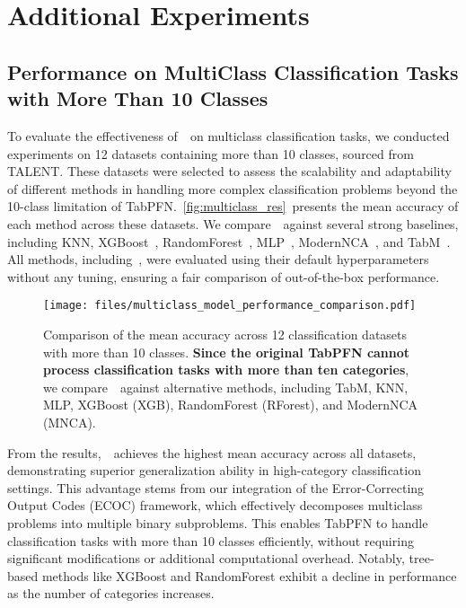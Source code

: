 \section{Additional Experiments}
\label{appendix:results}


\subsection{Performance on MultiClass Classification Tasks with
More Than 10 Classes}
To evaluate the effectiveness of~\name~on multiclass classification tasks, we conducted experiments on 12 datasets containing more than 10 classes, sourced from TALENT\cite{YeACloser}. These datasets were selected to assess the scalability and adaptability of different methods in handling more complex classification problems beyond the 10-class limitation of TabPFN.~\autoref{fig:multiclass_res}~presents the mean accuracy of each method across these datasets. We compare~\name~against several strong baselines, including KNN, XGBoost~\cite{chen2016xgboost}, RandomForest~\cite{Breiman01RandomForest}, MLP~\cite{GorishniyRKB21Revisiting}, ModernNCA~\cite{Ye2024ModernNCA}, and TabM~\cite{Yury2024TabM}.
 All methods, including~\name, were evaluated using their default hyperparameters without any tuning, ensuring a fair comparison of out-of-the-box performance.
\begin{figure}
    \centering
    \texttt{[image: files/multiclass\_model\_performance\_comparison.pdf]}
    \caption{Comparison of the mean accuracy across 12 classification datasets with more than 10 classes. \textbf{Since the original TabPFN cannot process classification tasks with more than ten categories}, we compare~\name~against alternative methods, including TabM, KNN, MLP, XGBoost (XGB), RandomForest (RForest), and ModernNCA (MNCA). }
    \label{fig:multiclass_res}
\end{figure}
From the results,~\name~achieves the highest mean accuracy across all datasets, demonstrating superior generalization ability in high-category classification settings. This advantage stems from our integration of the Error-Correcting Output Codes (ECOC) framework, which effectively decomposes multiclass problems into multiple binary subproblems. This enables TabPFN to handle classification tasks with more than 10 classes efficiently, without requiring significant modifications or additional computational overhead.
Notably, tree-based methods like XGBoost and RandomForest exhibit a decline in performance as the number of categories increases.


